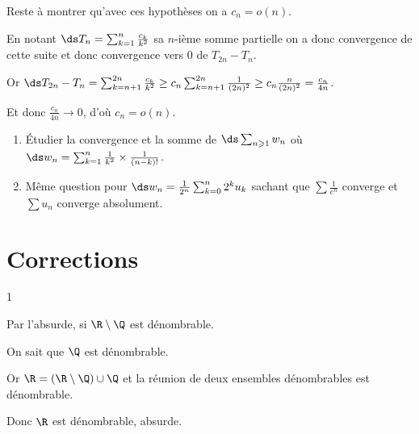 \begin{exercice}
    Reste à montrer qu'avec ces hypothèses on a $c_{n}=o(n)$.

    En notant $\ds T_{n}=\sum_{k=1}^{n}\frac{c_{k}}{k^{2}}$ sa $n$-ième somme partielle 
    on a donc convergence de cette suite et donc convergence vers 0 de $T_{2n}-T_{n}$.

    Or $\ds T_{2n}-T_{n}=\sum_{k=n+1}^{2n}\frac{c_{k}}{k^{2}}\ge c_{n}\sum_{k=n+1}^{2n}\frac{1}{(2n)^{2}}\ge c_{n}\frac{n}{(2n)^{2}} = \frac{c_n}{4n}$.

    Et donc $\frac{c_n}{4n} \to 0$, d'où $c_{n}=o(n)$.
\end{exercice}

\begin{exercice}
\begin{enumerate}
    \item Étudier la convergence et la somme de $\ds \sum_{n\geqslant1} w_n$ où $\ds w_n = \sum_{k=1}^n \frac{1}{k^2} \times \frac{1}{(n-k)!}$.
    \item Même question pour $\ds w_n = \frac{1}{2^n} \sum_{k=0}^n 2^k u_k$ sachant que $\sum \frac{1}{e^n}$ converge et $\sum u_n$ converge absolument.
\end{enumerate}
\end{exercice}

\newpage
\section{Corrections}

\begin{correction}{1}

Par l'absurde, si $\R \setminus \Q$ est dénombrable.

On sait que $\Q$ est dénombrable.

Or $\R = (\R \setminus \Q) \cup \Q$
et la réunion de deux ensembles dénombrables est dénombrable.
    
Donc $\R$ est dénombrable, absurde.
\end{correction}

